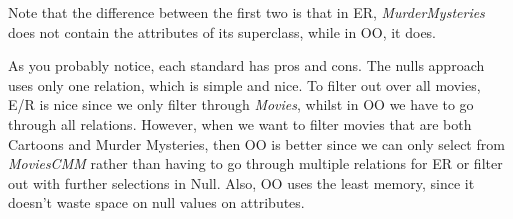 \documentclass{article}
\begin{document}
    Note that the difference between the first two is that in ER, \textit{MurderMysteries} does not contain the attributes of its superclass, while in OO, it does. 

    As you probably notice, each standard has pros and cons. The nulls approach uses only one relation, which is simple and nice. To filter out over all movies, E/R is nice since we only filter through \textit{Movies}, whilst in OO we have to go through all relations. However, when we want to filter movies that are both Cartoons and Murder Mysteries, then OO is better since we can only select from \textit{MoviesCMM} rather than having to go through multiple relations for ER or filter out with further selections in Null. Also, OO uses the least memory, since it doesn't waste space on null values on attributes.  
\end{document}
